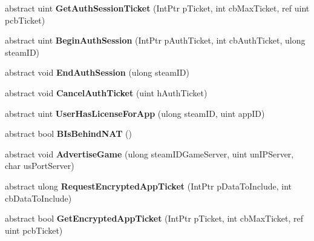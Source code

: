 \begin{DoxyCompactItemize}
abstract uint {\bfseries Get\+Auth\+Session\+Ticket} (Int\+Ptr p\+Ticket, int cb\+Max\+Ticket, ref uint pcb\+Ticket)
\item 
\mbox{\label{class_valve_1_1_steamworks_1_1_i_steam_user_a00e59ade00702761d6ad9f7a832c883d}} 
abstract uint {\bfseries Begin\+Auth\+Session} (Int\+Ptr p\+Auth\+Ticket, int cb\+Auth\+Ticket, ulong steam\+ID)
\item 
\mbox{\label{class_valve_1_1_steamworks_1_1_i_steam_user_a75f85dac08cc323a2c3fe3d1f2f4a92c}} 
abstract void {\bfseries End\+Auth\+Session} (ulong steam\+ID)
\item 
\mbox{\label{class_valve_1_1_steamworks_1_1_i_steam_user_ac64cf98166f7679bc0e15bb4b1869598}} 
abstract void {\bfseries Cancel\+Auth\+Ticket} (uint h\+Auth\+Ticket)
\item 
\mbox{\label{class_valve_1_1_steamworks_1_1_i_steam_user_a4985bd96456f31e7f89a0637a2f3a366}} 
abstract uint {\bfseries User\+Has\+License\+For\+App} (ulong steam\+ID, uint app\+ID)
\item 
\mbox{\label{class_valve_1_1_steamworks_1_1_i_steam_user_ae0b7d38f71c0287b4910f70f1275bd1b}} 
abstract bool {\bfseries B\+Is\+Behind\+N\+AT} ()
\item 
\mbox{\label{class_valve_1_1_steamworks_1_1_i_steam_user_a384df64decb0e3a8cd98379850c75cfc}} 
abstract void {\bfseries Advertise\+Game} (ulong steam\+I\+D\+Game\+Server, uint un\+I\+P\+Server, char us\+Port\+Server)
\item 
\mbox{\label{class_valve_1_1_steamworks_1_1_i_steam_user_af2541afb349130a094e77774a7745534}} 
abstract ulong {\bfseries Request\+Encrypted\+App\+Ticket} (Int\+Ptr p\+Data\+To\+Include, int cb\+Data\+To\+Include)
\item 
\mbox{\label{class_valve_1_1_steamworks_1_1_i_steam_user_a7060ed868197c2b1bb0afe51b3bda0a6}} 
abstract bool {\bfseries Get\+Encrypted\+App\+Ticket} (Int\+Ptr p\+Ticket, int cb\+Max\+Ticket, ref uint pcb\+Ticket)

\end{DoxyCompactItemize}
